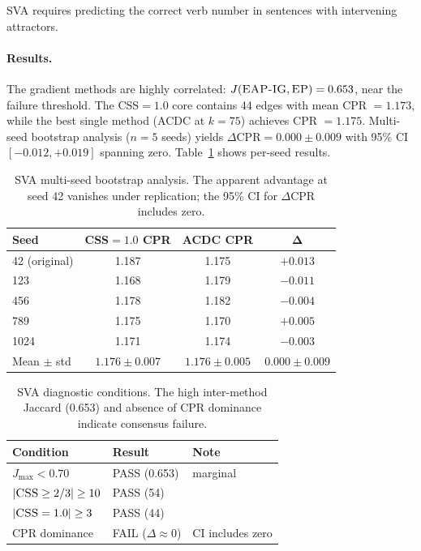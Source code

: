 \documentclass[11pt,a4paper]{article}
\newcommand{\css}{\textsc{CSS}}
\newcommand{\eapig}{\textsc{EAP-IG}}
\newcommand{\ep}{\textsc{EP}}
\newcommand{\acdc}{\textsc{ACDC}}
\begin{document}
SVA requires predicting the correct verb number in sentences with intervening attractors.

\paragraph{Results.}
The gradient methods are highly correlated: $J(\text{\eapig{}}, \text{\ep{}}) = 0.653$, near the failure threshold.
The \css{}$= 1.0$ core contains 44 edges with mean CPR $= 1.173$, while the best single method (\acdc{} at $k = 75$) achieves CPR $= 1.175$.
Multi-seed bootstrap analysis ($n = 5$ seeds) yields $\Delta\text{CPR} = 0.000 \pm 0.009$ with 95\% CI $[-0.012, +0.019]$ spanning zero.
Table~\ref{tab:sva_bootstrap} shows per-seed results.

\begin{table}[t]
\centering
\small
\begin{tabular}{lccc}
\toprule
\textbf{Seed} & \textbf{\css{}$=1.0$ CPR} & \textbf{\acdc{} CPR} & $\boldsymbol{\Delta}$ \\
\midrule
42 (original)   & 1.187 & 1.175 & $+0.013$ \\
123             & 1.168 & 1.179 & $-0.011$ \\
456             & 1.178 & 1.182 & $-0.004$ \\
789             & 1.175 & 1.170 & $+0.005$ \\
1024            & 1.171 & 1.174 & $-0.003$ \\
\midrule
Mean $\pm$ std  & $1.176 \pm 0.007$ & $1.176 \pm 0.005$ & $0.000 \pm 0.009$ \\
\bottomrule
\end{tabular}
\caption{SVA multi-seed bootstrap analysis. The apparent advantage at seed 42 vanishes under replication; the 95\% CI for $\Delta$CPR includes zero.}
\label{tab:sva_bootstrap}
\end{table}

\begin{table}[t]
\centering
\small
\begin{tabular}{lll}
\toprule
\textbf{Condition} & \textbf{Result} & \textbf{Note} \\
\midrule
$J_{\max} < 0.70$ & PASS (0.653) & marginal \\
$|\css{} \ge 2/3| \ge 10$ & PASS (54) & \\
$|\css{} = 1.0| \ge 3$ & PASS (44) & \\
CPR dominance & FAIL ($\Delta \approx 0$) & CI includes zero \\
\bottomrule
\end{tabular}
\caption{SVA diagnostic conditions. The high inter-method Jaccard (0.653) and absence of CPR dominance indicate consensus failure.}
\label{tab:sva_conditions}
\end{table}
\end{document}
